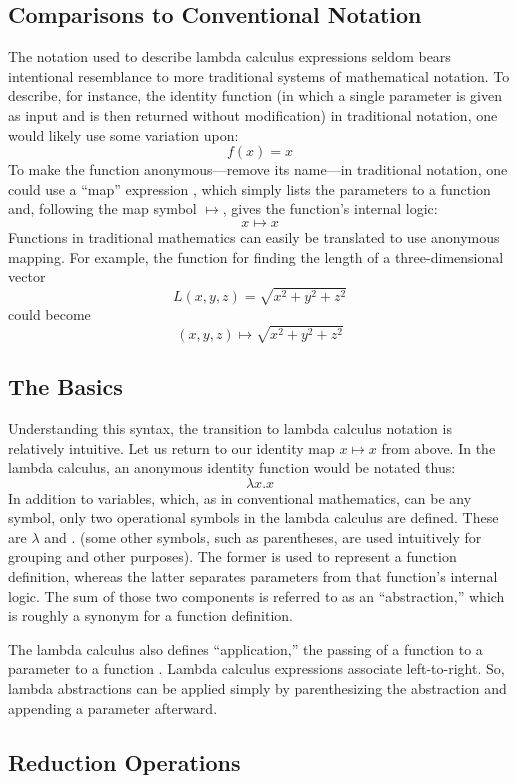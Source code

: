 \documentclass[twocolumn,titlepage,12pt]{article}
\begin{document}
\subsection{Comparisons to Conventional Notation}
The notation used to describe lambda calculus expressions seldom bears intentional resemblance to more traditional systems of mathematical notation. To describe, for instance, the identity function (in which a single parameter is given as input and is then returned without modification) in traditional notation, one would likely use some variation upon:
$$f(x)=x$$
To make the function anonymous---remove its name---in traditional notation, one could use a ``map'' expression \cite{intrographtheory}, which simply lists the parameters to a function and, following the map symbol $\mapsto$, gives the function's internal logic:
$$x\mapsto x$$
Functions in traditional mathematics can easily be translated to use anonymous mapping. For example, the function for finding the length of a three-dimensional vector
$$L(x,y,z)=\sqrt{x^2+y^2+z^2}$$
could become
$$(x,y,z) \mapsto \sqrt{x^2+y^2+z^2}$$

\subsection{The Basics}
Understanding this syntax, the transition to lambda calculus notation is relatively intuitive. Let us return to our identity map $x\mapsto x$ from above. In the lambda calculus, an anonymous identity function would be notated thus:
$$\lambda x.x$$
In addition to variables, which, as in conventional mathematics, can be any symbol, only two operational symbols in the lambda calculus are defined. These are $\lambda$ and $.$ (some other symbols, such as parentheses, are used intuitively for grouping and other purposes). The former is used to represent a function definition, whereas the latter separates parameters from that function's internal logic. The sum of those two components is referred to as an ``abstraction,'' which is roughly a synonym for a function definition.

The lambda calculus also defines ``application,'' the passing of a  function to a parameter to a function \cite{horowitz}. Lambda calculus expressions associate left-to-right. So, lambda abstractions can be applied simply by parenthesizing the abstraction and appending a parameter afterward.

\subsection{Reduction Operations}
\end{document}
